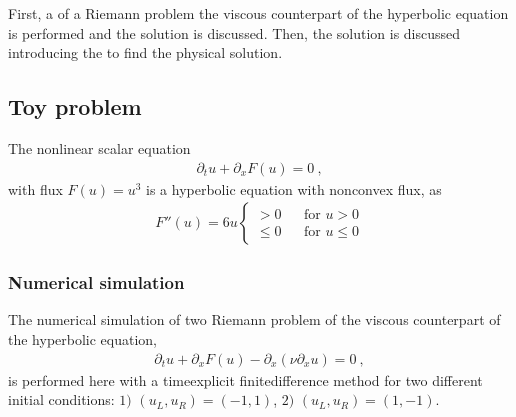 \documentclass[letterpaper,10pt,english]{jupyterBook}
\begin{document}
\sphinxAtStartPar
First, a {\hyperref[\detokenize{ch/pde/hyperbolic-non-convex:pdf-hyperbolic-non-convex-toy-problem-numerical}]{}} of a Riemann problem the viscous counterpart of the hyperbolic equation is performed and the solution is discussed. Then, the solution is discussed introducing the {\hyperref[\detokenize{ch/pde/hyperbolic-non-convex:pdf-hyperbolic-non-convex-toy-problem-olenik}]{}} to find the physical solution.


\subsection{Toy problem}
\label{\detokenize{ch/pde/hyperbolic-non-convex:toy-problem}}\label{\detokenize{ch/pde/hyperbolic-non-convex:pdf-hyperbolic-non-convex-toy-problem}}
\sphinxAtStartPar
The non\sphinxhyphen{}linear scalar equation
\begin{equation*}
\begin{split}\partial_t u + \partial_x F(u) = 0 \ ,\end{split}
\end{equation*}
\sphinxAtStartPar
with flux \(F(u) = u^3\) is a hyperbolic equation with non\sphinxhyphen{}convex flux, as
\begin{equation*}
\begin{split}F''(u) = 6 u \left\{ \begin{aligned} > 0 && \text{for $u > 0$} \\ \le 0 && \text{for $u \le 0$} \end{aligned} \right.\end{split}
\end{equation*}

\subsubsection{Numerical simulation}
\label{\detokenize{ch/pde/hyperbolic-non-convex:numerical-simulation}}\label{\detokenize{ch/pde/hyperbolic-non-convex:pdf-hyperbolic-non-convex-toy-problem-numerical}}
\sphinxAtStartPar
The numerical simulation of two Riemann problem of the viscous counterpart of the hyperbolic equation,
\begin{equation*}
\begin{split}\partial_t u + \partial_x F(u) - \partial_x ( \nu \partial_x u ) = 0 \ ,\end{split}
\end{equation*}
\sphinxAtStartPar
is performed here with a time\sphinxhyphen{}explicit finite\sphinxhyphen{}difference method for two different initial conditions: \(1)\) \((u_L, u_R) = (-1, 1)\), \(2)\) \((u_L, u_R) = (1,-1)\).
\end{document}
